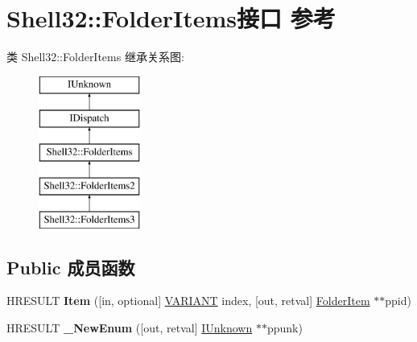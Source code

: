\hypertarget{interface_shell32_1_1_folder_items}{}\section{Shell32\+:\+:Folder\+Items接口 参考}
\label{interface_shell32_1_1_folder_items}
类 Shell32\+:\+:Folder\+Items 继承关系图\+:\begin{figure}[H]
\begin{center}
\leavevmode
\includegraphics[height=5.000000cm]{interface_shell32_1_1_folder_items}
\end{center}
\end{figure}
\subsection*{Public 成员函数}
\begin{DoxyCompactItemize}
\item 
\mbox{\label{interface_shell32_1_1_folder_items_a3ac477467dfaf8595143273cd60b95fd}} 
H\+R\+E\+S\+U\+LT {\bfseries Item} (\mbox{[}in, optional\mbox{]} \hyperlink{structtag_v_a_r_i_a_n_t}{V\+A\+R\+I\+A\+NT} index, \mbox{[}out, retval\mbox{]} \hyperlink{interface_shell32_1_1_folder_item}{Folder\+Item} $\ast$$\ast$ppid)
\item 
\mbox{\label{interface_shell32_1_1_folder_items_aa04f688ec8b7f97869c13bfd13bb0db8}} 
H\+R\+E\+S\+U\+LT {\bfseries \+\_\+\+New\+Enum} (\mbox{[}out, retval\mbox{]} \hyperlink{interface_i_unknown}{I\+Unknown} $\ast$$\ast$ppunk)
\end{DoxyCompactItemize}
